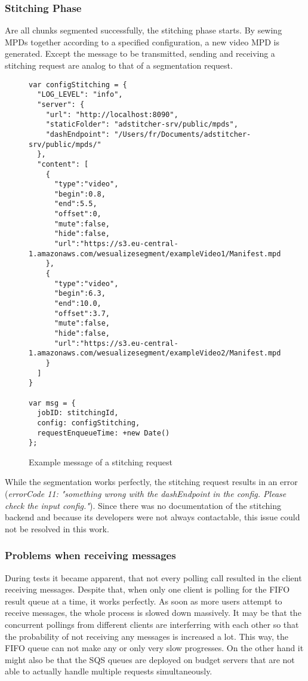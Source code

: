 \documentclass[conference]{IEEEtran}
\begin{document}
\subsubsection{Stitching Phase}
Are all chunks segmented successfully, the stitching phase starts.
By sewing MPDs together according to a specified configuration, a new video MPD is generated.
Except the message to be transmitted, sending and receiving a stitching request are analog to that of a segmentation request.
\begin{figure}[H]
\begin{lstlisting}
var configStitching = {
  "LOG_LEVEL": "info",
  "server": {
    "url": "http://localhost:8090",
    "staticFolder": "adstitcher-srv/public/mpds",
    "dashEndpoint": "/Users/fr/Documents/adstitcher-srv/public/mpds/"
  },
  "content": [
    {
      "type":"video",
      "begin":0.8,
      "end":5.5,
      "offset":0,
      "mute":false,
      "hide":false,
      "url":"https://s3.eu-central-1.amazonaws.com/wesualizesegment/exampleVideo1/Manifest.mpd"
    },
    {
      "type":"video",
      "begin":6.3,
      "end":10.0,
      "offset":3.7,
      "mute":false,
      "hide":false,
      "url":"https://s3.eu-central-1.amazonaws.com/wesualizesegment/exampleVideo2/Manifest.mpd"
    }
  ]
}

var msg = {
  jobID: stitchingId,
  config: configStitching,
  requestEnqueueTime: +new Date()
};
\end{lstlisting}
\caption{Example message of a stitching request}
\end{figure}
While the segmentation works perfectly, the stitching request results in an error (\textit{errorCode 11: "something wrong with the dashEndpoint in the config. Please check the input config."}).
Since there was no documentation of the stitching backend and because its developers were not always contactable, this issue could not be resolved in this work.
\\
\subsubsection{Problems when receiving messages}
During tests it became apparent, that not every polling call resulted in the client receiving messages.
Despite that, when only one client is polling for the FIFO result queue at a time, it works perfectly.
As soon as more users attempt to receive messages, the whole process is slowed down massively.
It may be that the concurrent pollings from different clients are interferring with each other so that the probability of not receiving any messages is increased a lot.
This way, the FIFO queue can not make any or only very slow progresses.
On the other hand it might also be that the SQS queues are deployed on budget servers that are not able to actually handle multiple requests simultaneously.
\end{document}
